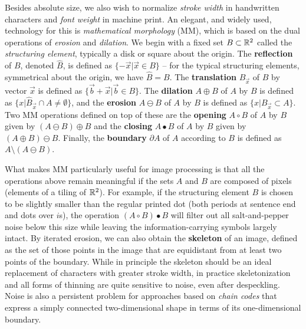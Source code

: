 Besides absolute size, we also wish to normalize {\it stroke
  width} in handwritten characters and {\it font
  weight} in machine print. An elegant, and widely used,
technology for this is {\it mathematical morphology} (MM), which is based on the dual operations of {\it erosion} and
{\it dilation}. We begin with a fixed set $B \subset {\Bbb R}^2$ called the
{\it structuring element}, typically a disk or
square about the origin. The {\bf reflection} of $B$,
denoted $\hat{B}$, is defined as $\{-\vec{x}|\vec{x}\in B\}$ -- for the typical
structuring elements, symmetrical about the origin, we have $\hat{B}=B$. The
{\bf translation} $B_{\vec{x}}$ of $B$ by vector $\vec{x}$ is defined as
$\{\vec{b}+\vec{x}|\vec{b}\in B\}$. The {\bf dilation} $A \oplus B$ of $A$ by
$B$ is defined as $\{x|\hat{B}_{\vec{x}} \cap A \neq
\emptyset \}$, and the {\bf erosion} $A \ominus B$ of
$A$ by $B$ is defined as $\{x | B_{\vec{x}} \subset A \}$. Two MM operations
defined on top of these are the {\bf opening} $A\circ B$
of $A$ by $B$ given by $(A\ominus B)\oplus B$ and the {\bf
  closing} $A\bullet B$ of $A$ by $B$ given by $(A\oplus
B)\ominus B$. Finally, the {\bf boundary} $\partial A$
of $A$ according to $B$ is defined as $A \setminus (A \ominus B)$.

What makes MM particularly useful for image processing is that all the
operations above remain meaningful if the sets $A$ and $B$ are composed of
pixels (elements of a tiling of ${\Bbb R}^2$). For example, if the structuring
element $B$ is chosen to be slightly smaller than the regular printed dot
(both periods at sentence end and dots over $i$s), the operation $(A \circ B)
\bullet B$ will filter out all salt-and-pepper noise below this size while
leaving the information-carrying symbols largely intact.  By iterated erosion,
we can also obtain the {\bf skeleton} of an image, defined as the set of those
points in the image that are equidistant from at least two points of the
boundary. While in principle the skeleton should
be an ideal replacement of characters with greater stroke width, in practice
skeletonization and all forms of thinning are quite sensitive to noise, even
after despeckling. Noise is also a persistent problem for approaches based on
{\it chain codes} that express a simply connected two-dimensional shape in
terms of its one-dimensional boundary.

